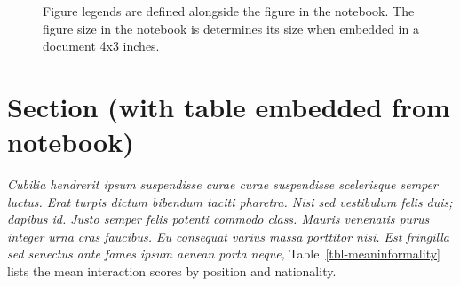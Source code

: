 \documentclass[
  a4paper,
]{scrbook}
\begin{document}
\begin{figure}[H]


\caption{\label{fig-meaninformality}Figure legends are defined alongside
the figure in the notebook. The figure size in the notebook is
determines its size when embedded in a document 4x3 inches.}

\end{figure}%

\section{Section (with table embedded from
notebook)}\label{section-with-table-embedded-from-notebook}

\emph{Cubilia hendrerit ipsum suspendisse curae curae suspendisse
scelerisque semper luctus. Erat turpis dictum bibendum taciti pharetra.
Nisi sed vestibulum felis duis; dapibus id. Justo semper felis potenti
commodo class. Mauris venenatis purus integer urna cras faucibus. Eu
consequat varius massa porttitor nisi. Est fringilla sed senectus ante
fames ipsum aenean porta neque,} Table~\ref{tbl-meaninformality} lists
the mean interaction scores by position and nationality.
\end{document}
